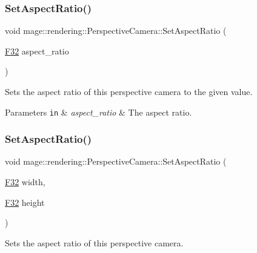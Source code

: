 \subsubsection{\texorpdfstring{Set\+Aspect\+Ratio()}{SetAspectRatio()}\hspace{0.1cm}{\footnotesize\ttfamily [1/2]}}
{\footnotesize\ttfamily void mage\+::rendering\+::\+Perspective\+Camera\+::\+Set\+Aspect\+Ratio (\begin{DoxyParamCaption}\item[{\mbox{\hyperlink{namespacemage_aa97e833b45f06d60a0a9c4fc22ae02c0}{F32}}}]{aspect\+\_\+ratio }\end{DoxyParamCaption})\hspace{0.3cm}{\ttfamily [noexcept]}}

Sets the aspect ratio of this perspective camera to the given value.


\begin{DoxyParams}[1]{Parameters}
\mbox{\tt in}  & {\em aspect\+\_\+ratio} & The aspect ratio. \\
\hline
\end{DoxyParams}
\mbox{\label{classmage_1_1rendering_1_1_perspective_camera_a09a93f5281723ec6ccf1adf636619e60}} 
\subsubsection{\texorpdfstring{Set\+Aspect\+Ratio()}{SetAspectRatio()}\hspace{0.1cm}{\footnotesize\ttfamily [2/2]}}
{\footnotesize\ttfamily void mage\+::rendering\+::\+Perspective\+Camera\+::\+Set\+Aspect\+Ratio (\begin{DoxyParamCaption}\item[{\mbox{\hyperlink{namespacemage_aa97e833b45f06d60a0a9c4fc22ae02c0}{F32}}}]{width,  }\item[{\mbox{\hyperlink{namespacemage_aa97e833b45f06d60a0a9c4fc22ae02c0}{F32}}}]{height }\end{DoxyParamCaption})\hspace{0.3cm}{\ttfamily [noexcept]}}

Sets the aspect ratio of this perspective camera.


